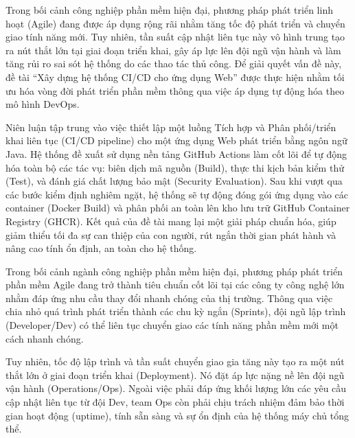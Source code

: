 \documentclass[12pt,a4paper,oneside]{extreport}
\begin{document}
\ctumainmatter

Trong bối cảnh công nghiệp phần mềm hiện đại, phương pháp phát triển linh hoạt
(Agile) đang được áp dụng rộng rãi nhằm tăng tốc độ phát triển và chuyển giao
tính năng mới. Tuy nhiên, tần suất cập nhật liên tục này vô hình trung tạo ra
nút thắt lớn tại giai đoạn triển khai, gây áp lực lên đội ngũ vận hành và làm
tăng rủi ro sai sót hệ thống do các thao tác thủ công. Để giải quyết vấn đề
này, đề tài ``Xây dựng hệ thống CI/CD cho ứng dụng Web'' được thực hiện nhằm tối
ưu hóa vòng đời phát triển phần mềm thông qua việc áp dụng tự động hóa theo mô
hình DevOps.

Niên luận tập trung vào việc thiết lập một luồng Tích hợp và Phân phối/triển
khai liên tục (CI/CD pipeline) cho một ứng dụng Web phát triển bằng ngôn ngữ
Java. Hệ thống đề xuất sử dụng nền tảng GitHub Actions làm cốt lõi để tự động
hóa toàn bộ các tác vụ: biên dịch mã nguồn (Build), thực thi kịch bản kiểm thử
(Test), và đánh giá chất lượng bảo mật (Security Evaluation). Sau khi vượt qua
các bước kiểm định nghiêm ngặt, hệ thống sẽ tự động đóng gói ứng dụng vào các
container (Docker Build) và phân phối an toàn lên kho lưu trữ GitHub Container
Registry (GHCR). Kết quả của đề tài mang lại một giải pháp chuẩn hóa, giúp giảm
thiểu tối đa sự can thiệp của con người, rút ngắn thời gian phát hành và nâng
cao tính ổn định, an toàn cho hệ thống.

Trong bối cảnh ngành công nghiệp phần mềm hiện đại, phương pháp phát triển phần
mềm Agile đang trở thành tiêu chuẩn cốt lõi tại các công ty công nghệ lớn nhằm
đáp ứng nhu cầu thay đổi nhanh chóng của thị trường. Thông qua việc chia nhỏ quá
trình phát triển thành các chu kỳ ngắn (Sprints), đội ngũ lập trình
(Developer/Dev) có thể liên tục chuyển giao các tính năng phần mềm mới một cách
nhanh chóng.

Tuy nhiên, tốc độ lập trình và tần suất chuyển giao gia tăng này tạo ra một nút
thắt lớn ở giai đoạn triển khai (Deployment). Nó đặt áp lực nặng nề lên đội ngũ
vận hành (Operations/Ops). Ngoài việc phải đáp ứng khối lượng lớn các yêu cầu
cập nhật liên tục từ đội Dev, team Ops còn phải chịu trách nhiệm đảm bảo thời
gian hoạt động (uptime), tính sẵn sàng và sự ổn định của hệ thống máy chủ tổng
thể.
\end{document}
